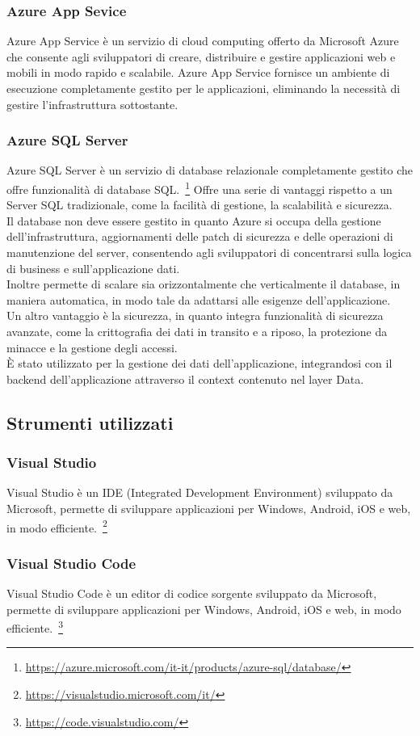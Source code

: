 \subsubsection{Azure App Sevice}
Azure App Service è un servizio di cloud computing offerto da Microsoft Azure che consente agli sviluppatori di creare, distribuire e gestire applicazioni web e mobili in modo rapido e scalabile. Azure App Service fornisce un ambiente di esecuzione completamente gestito per le applicazioni, eliminando la necessità di gestire l'infrastruttura sottostante.
\subsubsection{Azure SQL Server}
Azure SQL Server è un servizio di database relazionale completamente gestito che offre funzionalità di database SQL.~\footnote{\url{https://azure.microsoft.com/it-it/products/azure-sql/database/}}
Offre una serie di vantaggi rispetto a un Server SQL tradizionale, come la facilità di gestione, la scalabilità e sicurezza.\\
Il database non deve essere gestito in quanto Azure si occupa della gestione dell'infrastruttura, aggiornamenti delle patch di sicurezza e delle operazioni di manutenzione del server, consentendo agli sviluppatori di concentrarsi sulla logica di business e sull'applicazione dati.\\
Inoltre permette di scalare sia orizzontalmente che verticalmente il database, in maniera automatica, in modo tale da adattarsi alle esigenze dell'applicazione.\\
Un altro vantaggio è la sicurezza, in quanto integra funzionalità di sicurezza avanzate, come la crittografia dei dati in transito e a riposo, la protezione da minacce e la gestione degli accessi.\\
È stato utilizzato per la gestione dei dati dell'applicazione, integrandosi con il backend dell'applicazione attraverso il context contenuto nel layer Data.\\
\subsection{Strumenti utilizzati}
\subsubsection{Visual Studio}
Visual Studio è un IDE (Integrated Development Environment) sviluppato da Microsoft, permette di sviluppare applicazioni per Windows, Android, iOS e web, in modo efficiente.~\footnote{\url{https://visualstudio.microsoft.com/it/}}
\subsubsection{Visual Studio Code}
Visual Studio Code è un editor di codice sorgente sviluppato da Microsoft, permette di sviluppare applicazioni per Windows, Android, iOS e web, in modo efficiente.~\footnote{\url{https://code.visualstudio.com/}}